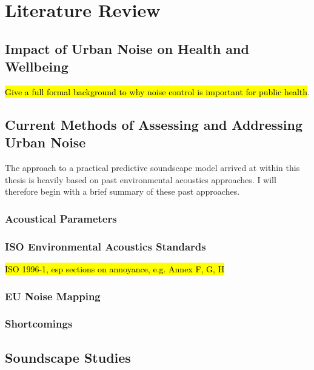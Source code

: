 \chapter{Literature Review}
\label{ch:lit}

\section{Impact of Urban Noise on Health and Wellbeing}


\hl{Give a full formal background to why noise control is important for public health}.

\section{Current Methods of Assessing and Addressing Urban Noise}

The approach to a practical predictive soundscape model arrived at within this thesis is heavily based on past environmental acoustics approaches. I will therefore begin with a brief summary of these past approaches.

\subsection{Acoustical Parameters}

\subsection{ISO Environmental Acoustics Standards}
\hl{ISO 1996-1, esp sections on annoyance, e.g. Annex F, G, H}

\subsection{EU Noise Mapping}


\subsection{Shortcomings}


\section{Soundscape Studies}


